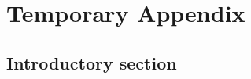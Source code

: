 \chapter{Temporary Appendix}
\label{chap:tmp}

\section{Introductory section}
\label{sec:tmp:intro}
